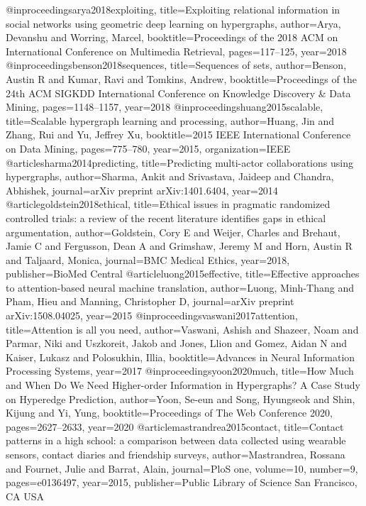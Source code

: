 @inproceedings{arya2018exploiting,
  title={Exploiting relational information in social networks using geometric deep learning on hypergraphs},
  author={Arya, Devanshu and Worring, Marcel},
  booktitle={Proceedings of the 2018 ACM on International Conference on Multimedia Retrieval},
  pages={117--125},
  year={2018}
}
@inproceedings{benson2018sequences,
  title={Sequences of sets},
  author={Benson, Austin R and Kumar, Ravi and Tomkins, Andrew},
  booktitle={Proceedings of the 24th ACM SIGKDD International Conference on Knowledge Discovery \& Data Mining},
  pages={1148--1157},
  year={2018}
}
@inproceedings{huang2015scalable,
  title={Scalable hypergraph learning and processing},
  author={Huang, Jin and Zhang, Rui and Yu, Jeffrey Xu},
  booktitle={2015 IEEE International Conference on Data Mining},
  pages={775--780},
  year={2015},
  organization={IEEE}
}
@article{sharma2014predicting,
  title={Predicting multi-actor collaborations using hypergraphs},
  author={Sharma, Ankit and Srivastava, Jaideep and Chandra, Abhishek},
  journal={arXiv preprint arXiv:1401.6404},
  year={2014}
}
@article{goldstein2018ethical,
  title={Ethical issues in pragmatic randomized controlled trials: a review of the recent literature identifies gaps in ethical argumentation},
  author={Goldstein, Cory E and Weijer, Charles and Brehaut, Jamie C and Fergusson, Dean A and Grimshaw, Jeremy M and Horn, Austin R and Taljaard, Monica},
  journal={BMC Medical Ethics},
  year={2018},
  publisher={BioMed Central}
}
@article{luong2015effective,
  title={Effective approaches to attention-based neural machine translation},
  author={Luong, Minh-Thang and Pham, Hieu and Manning, Christopher D},
  journal={arXiv preprint arXiv:1508.04025},
  year={2015}
}
@inproceedings{vaswani2017attention,
  title={Attention is all you need},
  author={Vaswani, Ashish and Shazeer, Noam and Parmar, Niki and Uszkoreit, Jakob and Jones, Llion and Gomez, Aidan N and Kaiser, Lukasz and Polosukhin, Illia},
  booktitle={Advances in Neural Information Processing Systems},
  year={2017}
}
@inproceedings{yoon2020much,
  title={How Much and When Do We Need Higher-order Information in Hypergraphs? A Case Study on Hyperedge Prediction},
  author={Yoon, Se-eun and Song, Hyungseok and Shin, Kijung and Yi, Yung},
  booktitle={Proceedings of The Web Conference 2020},
  pages={2627--2633},
  year={2020}
}
@article{mastrandrea2015contact,
  title={Contact patterns in a high school: a comparison between data collected using wearable sensors, contact diaries and friendship surveys},
  author={Mastrandrea, Rossana and Fournet, Julie and Barrat, Alain},
  journal={PloS one},
  volume={10},
  number={9},
  pages={e0136497},
  year={2015},
  publisher={Public Library of Science San Francisco, CA USA}
}
